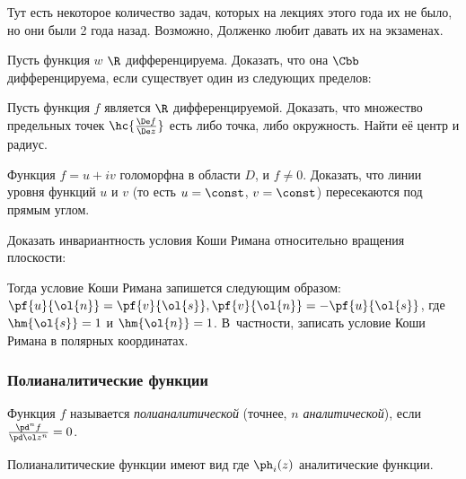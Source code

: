 \documentclass[a4paper]{article}
\begin{document}
\begin{petit}
Тут есть некоторое количество задач, которых на лекциях этого года их не было, но они были 2 года назад.
Возможно, Долженко любит давать их на экзаменах.

\medskip

\begin{problem}
Пусть функция $w$ $\R$ дифференцируема.
Доказать, что она $\Cbb$ дифференцируема, если существует один из следующих пределов:
\end{problem}

\begin{problem}
Пусть функция $f$ является $\R$ дифференцируемой.
Доказать, что множество предельных точек $\hc{\frac{\De f}{\De z}}$ есть либо точка, либо окружность.
Найти её центр и радиус.
\end{problem}

\begin{problem}
Функция $f = u + iv$ голоморфна в области $D$, и $f \neq 0$. Доказать, что линии уровня функций $u$ и $v$
(то есть $u=\const$, $v=\const$) пересекаются под прямым углом.
\end{problem}

\begin{problem}
Доказать инвариантность условия Коши Римана относительно вращения плоскости:

Тогда условие Коши Римана запишется следующим образом:
$\pf{u}{\ol{n}} = \pf{v}{\ol{s}},\pf{v}{\ol{n}} = - \pf{u}{\ol{s}}$, где $\hm{\ol{s}} = 1$ и $\hm{\ol{n}} = 1$.
В~частности, записать условие Коши Римана в полярных координатах.
\end{problem}
\end{petit}

\subsubsection{Полианалитические функции}

\begin{df}
Функция $f$ называется \emph{полианалитической} (точнее, \emph{$n$ аналитической}), если $\frac{\pd^n f}{\pd \ol z^n} = 0$.
\end{df}

Полианалитические функции имеют вид
где $\ph_i(z)$ аналитические функции.
\end{document}
